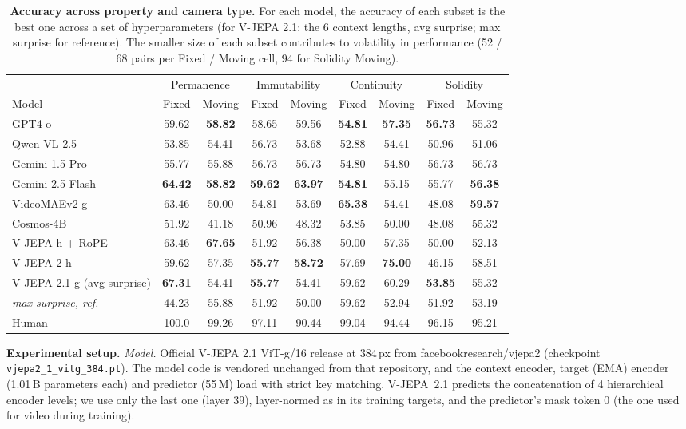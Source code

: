 \documentclass[10pt]{article}
\begin{document}
\begin{table}[h]
\centering
\caption{\textbf{Accuracy across property and camera type.} For each model, the accuracy of each subset is the best one
across a set of hyperparameters (for V-JEPA 2.1: the 6 context lengths, avg surprise; max surprise for reference). The smaller size of each subset contributes to
volatility in performance (52 / 68 pairs per Fixed / Moving cell, 94 for Solidity Moving).}
\small
\setlength{\tabcolsep}{4pt}
\begin{tabular}{l|cc|cc|cc|cc}
\toprule
& \multicolumn{2}{c|}{Permanence} & \multicolumn{2}{c|}{Immutability} & \multicolumn{2}{c|}{Continuity} & \multicolumn{2}{c}{Solidity} \\
Model & Fixed & Moving & Fixed & Moving & Fixed & Moving & Fixed & Moving \\
\midrule
GPT4-o & 59.62 & \textbf{58.82} & 58.65 & 59.56 & \textbf{54.81} & \textbf{57.35} & \textbf{56.73} & 55.32 \\
Qwen-VL 2.5 & 53.85 & 54.41 & 56.73 & 53.68 & 52.88 & 54.41 & 50.96 & 51.06 \\
Gemini-1.5 Pro & 55.77 & 55.88 & 56.73 & 56.73 & 54.80 & 54.80 & 56.73 & 56.73 \\
Gemini-2.5 Flash & \textbf{64.42} & \textbf{58.82} & \textbf{59.62} & \textbf{63.97} & \textbf{54.81} & 55.15 & 55.77 & \textbf{56.38} \\
\midrule
VideoMAEv2-g & 63.46 & 50.00 & 54.81 & 53.69 & \textbf{65.38} & 54.41 & 48.08 & \textbf{59.57} \\
Cosmos-4B & 51.92 & 41.18 & 50.96 & 48.32 & 53.85 & 50.00 & 48.08 & 55.32 \\
V-JEPA-h + RoPE & 63.46 & \textbf{67.65} & 51.92 & 56.38 & 50.00 & 57.35 & 50.00 & 52.13 \\
V-JEPA 2-h & 59.62 & 57.35 & \textbf{55.77} & \textbf{58.72} & 57.69 & \textbf{75.00} & 46.15 & 58.51 \\
\rowcolor{ours}
V-JEPA 2.1-g (avg surprise) & \textbf{67.31} & 54.41 & \textbf{55.77} & 54.41 & 59.62 & 60.29 & \textbf{53.85} & 55.32 \\
\rowcolor{ours}
\quad\textit{max surprise, ref.} & 44.23 & 55.88 & 51.92 & 50.00 & 59.62 & 52.94 & 51.92 & 53.19 \\
\midrule
Human & 100.0 & 99.26 & 97.11 & 90.44 & 99.04 & 94.44 & 96.15 & 95.21 \\
\bottomrule
\end{tabular}
\end{table}

\vspace{-2pt}
\small
\textbf{Experimental setup.}
\emph{Model.} Official V-JEPA 2.1 ViT-g/16 release at 384\,px from facebookresearch/\allowbreak vjepa2
(checkpoint \texttt{vjepa2\_1\_vitg\_384.pt}). The model code is vendored unchanged from that repository, and the context encoder,
target (EMA) encoder (1.01\,B parameters each) and predictor (55\,M) load with strict key matching. V-JEPA~2.1
predicts the concatenation of 4 hierarchical encoder levels; we use only the last one (layer 39), layer-normed
as in its training targets, and the predictor's mask token 0 (the one used for video during training).
\end{document}
